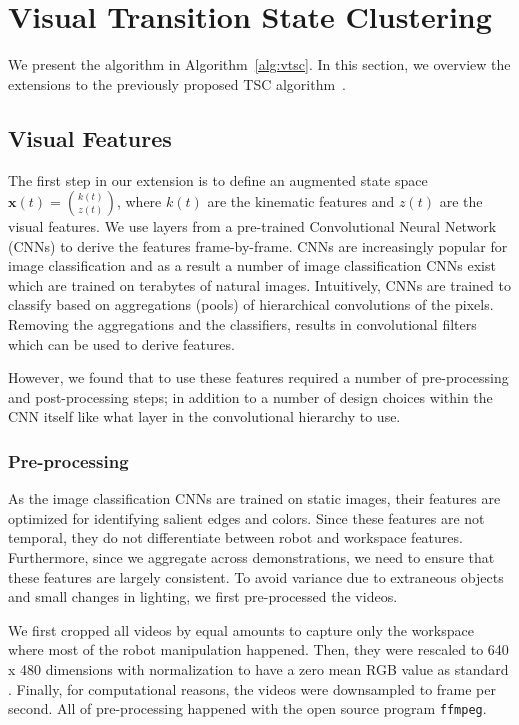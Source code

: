 \section{Visual Transition State Clustering}
We present the \tsc algorithm in Algorithm~\ref{alg:vtsc}.
In this section, we overview the extensions to the previously proposed TSC algorithm~\cite{krishnan2015tsc}.

\subsection{Visual Features}
The first step in our extension is to define an augmented state space $\mathbf{x}(t) = \binom{k(t)}{z(t)}$, where $k(t)$ are the kinematic features and $z(t)$ are the visual features.
We use layers from a pre-trained Convolutional Neural Network (CNNs) to derive the features frame-by-frame.
CNNs are increasingly popular for image classification and as a result a number of image classification CNNs exist which are trained on terabytes of natural images.
Intuitively, CNNs are trained to classify based on aggregations (pools) of hierarchical convolutions of the pixels.
Removing the aggregations and the classifiers, results in convolutional filters which can be used to derive features.

However, we found that to use these features required a number of pre-processing and post-processing steps; in addition to a number of design choices within the CNN itself like what layer in the convolutional hierarchy to use.

\subsubsection{Pre-processing}
As the image classification CNNs are trained on static images, their features are optimized for identifying salient edges and colors.
Since these features are not temporal, they do not differentiate between robot and workspace features.
Furthermore, since we aggregate across demonstrations, we need to ensure that these features are largely consistent.
To avoid variance due to extraneous objects and small changes in lighting, we first pre-processed the videos.

We first cropped all videos by equal amounts to capture only the workspace where most of the robot manipulation happened. 
Then, they were rescaled to 640 x 480 dimensions with normalization to have a zero mean RGB value as standard \cite{krizhevsky2012imagenet,simonyan2014very}. 
Finally, for computational reasons, the videos were downsampled to  frame per second.  
All of pre-processing happened with the open source program \texttt{ffmpeg}.

